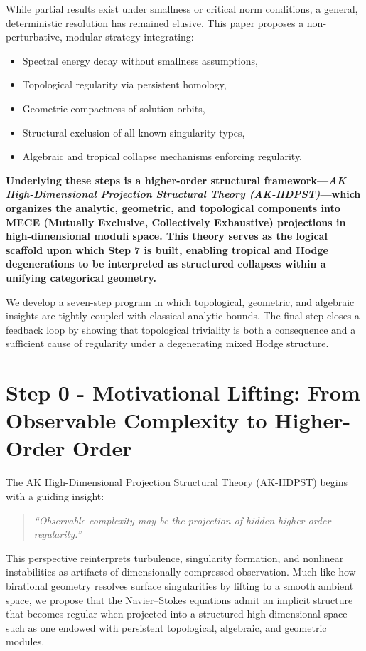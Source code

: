 \documentclass[11pt]{article}
\theoremstyle{definition}
\begin{document}
While partial results exist under smallness or critical norm conditions, a general, deterministic resolution has remained elusive. This paper proposes a non-perturbative, modular strategy integrating:
\begin{itemize}
  \item Spectral energy decay without smallness assumptions,
  \item Topological regularity via persistent homology,
  \item Geometric compactness of solution orbits,
  \item Structural exclusion of all known singularity types,
  \item Algebraic and tropical collapse mechanisms enforcing regularity.
\end{itemize}

\textbf{Underlying these steps is a higher-order structural framework---\textit{AK High-Dimensional Projection Structural Theory (AK-HDPST)}---which organizes the analytic, geometric, and topological components into MECE (Mutually Exclusive, Collectively Exhaustive) projections in high-dimensional moduli space. This theory serves as the logical scaffold upon which Step 7 is built, enabling tropical and Hodge degenerations to be interpreted as structured collapses within a unifying categorical geometry.}

We develop a seven-step program in which topological, geometric, and algebraic insights are tightly coupled with classical analytic bounds. The final step closes a feedback loop by showing that topological triviality is both a consequence and a sufficient cause of regularity under a degenerating mixed Hodge structure.

\section{Step 0 - Motivational Lifting: From Observable Complexity to Higher-Order Order}

The AK High-Dimensional Projection Structural Theory (AK-HDPST) begins with a guiding insight:

\begin{quote}
\textit{“Observable complexity may be the projection of hidden higher-order regularity.”}
\end{quote}

This perspective reinterprets turbulence, singularity formation, and nonlinear instabilities as artifacts of dimensionally compressed observation. Much like how birational geometry resolves surface singularities by lifting to a smooth ambient space, we propose that the Navier–Stokes equations admit an implicit structure that becomes regular when projected into a structured high-dimensional space—such as one endowed with persistent topological, algebraic, and geometric modules.
\end{document}
